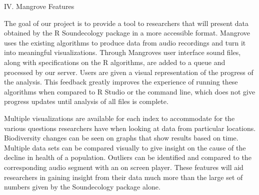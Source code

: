 \begin{center}
IV. Mangrove Features
\end{center}
\begin{flushleft}
\setlength{\parindent}{0.125in}
The goal of our project is to provide a tool to researchers that will present data obtained by the R Soundecology package in a more accessible format. Mangrove uses the existing  algorithms to produce data from audio recordings and turn it into meaningful visualizations. Through Mangrove\textquotesingle s user interface sound files, along with specifications on the R algorithms, are added to a queue and processed by our server. Users are given a visual representation of the progress of the analysis. This feedback greatly improves the experience of running these algorithms when compared to R Studio or the command line, which does not give progress updates until analysis of all files is complete.\par
Multiple visualizations are available for each index to accommodate for the various questions  researchers have when looking at data from particular locations. Biodiversity changes can be seen on graphs that show results based on time. Multiple data sets can be compared visually to give insight on the cause of the decline in health of a population. Outliers can be identified and compared to the corresponding audio segment with an on screen player. These features will aid researchers in gaining insight from their data much more than the large set of numbers given by the Soundecology package alone.\par
\pagebreak[2]
\end{flushleft}